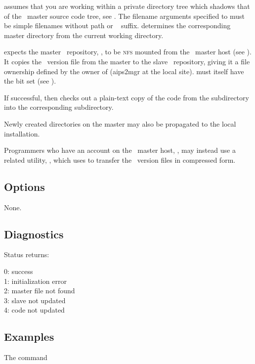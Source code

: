  assumes that you are working within a private directory tree which
shadows that of the \aipspp\ master source code tree, see .
The filename arguments specified to  must be simple filenames without
path or \rcs\  suffix.   determines the corresponding master
directory from the current working directory.

 expects the master \rcs\ repository, , to be
\textsc{nfs} mounted from the \aipspp\ master host (see
).  It copies the \rcs\ version file from the master to
the slave \rcs\ repository, giving it a file ownership defined by the owner of
 (aips2mgr at the local site).   must itself have the
 bit set (see ).

If successful,  then checks out a plain-text copy of the code from the
 subdirectory into the corresponding 
subdirectory.

Newly created directories on the master may also be propagated to the local
installation.

Programmers who have an account on the \aipspp\ master host,
, may instead use a related utility, , which
uses  to transfer the \rcs\ version files in compressed form.

\subsection*{Options}

None.

\subsection*{Diagnostics}

Status returns:
\begin{status}
   0: success\\
   1: initialization error\\
   2: master file not found\\
   3: slave not updated\\
   4: code not updated
\end{status}

\subsection*{Examples}

The command

